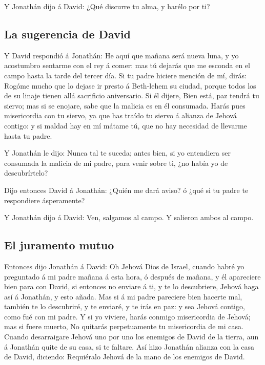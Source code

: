  Y Jonathán dijo á David: ¿Qué discurre tu alma, y harélo
por ti?

\hypertarget{la-sugerencia-de-david}{%
\subsection{La sugerencia de David}\label{la-sugerencia-de-david}}

 Y David respondió á Jonathán: He aquí que mañana será nueva
luna, y yo acostumbro sentarme con el rey á comer: mas tú dejarás que me
esconda en el campo hasta la tarde del tercer día.  Si tu
padre hiciere mención de mí, dirás: Rogóme mucho que lo dejase ir presto
á Beth-lehem su ciudad, porque todos los de su linaje tienen allá
sacrificio aniversario.  Si él dijere, Bien está, paz tendrá
tu siervo; mas si se enojare, sabe que la malicia es en él consumada.
 Harás pues misericordia con tu siervo, ya que has traído tu
siervo á alianza de Jehová contigo: y si maldad hay en mí mátame tú, que
no hay necesidad de llevarme hasta tu padre.

 Y Jonathán le dijo: Nunca tal te suceda; antes bien, si yo
entendiera ser consumada la malicia de mi padre, para venir sobre ti,
¿no había yo de descubrírtelo?

 Dijo entonces David á Jonathán: ¿Quién me dará aviso? ó
¿qué si tu padre te respondiere ásperamente?

 Y Jonathán dijo á David: Ven, salgamos al campo. Y
salieron ambos al campo.

\hypertarget{el-juramento-mutuo}{%
\subsection{El juramento mutuo}\label{el-juramento-mutuo}}

 Entonces dijo Jonathán á David: Oh Jehová Dios de Israel,
cuando habré yo preguntado á mi padre mañana á esta hora, ó después de
mañana, y él apareciere bien para con David, si entonces no enviare á
ti, y te lo descubriere,  Jehová haga así á Jonathán, y
esto añada. Mas si á mi padre pareciere bien hacerte mal, también te lo
descubriré, y te enviaré, y te irás en paz: y sea Jehová contigo, como
fué con mi padre.  Y si yo viviere, harás conmigo
misericordia de Jehová; mas si fuere muerto,  No quitarás
perpetuamente tu misericordia de mi casa. Cuando desarraigare Jehová uno
por uno los enemigos de David de la tierra, aun á Jonathán quite de su
casa, si te faltare.  Así hizo Jonathán alianza con la casa
de David, diciendo: Requiéralo Jehová de la mano de los enemigos de
David.

